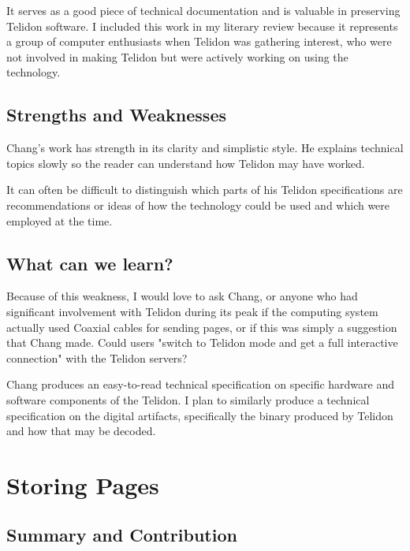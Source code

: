 \documentclass[sigconf]{acmart}
\begin{document}
It serves as a good piece of technical documentation and is valuable in preserving Telidon software. I included this work in my literary review because it represents a group of computer enthusiasts when Telidon was gathering interest, who were not involved in making Telidon but were actively working on using the technology.

\subsection{Strengths and Weaknesses}

Chang's work has strength in its clarity and simplistic style. He explains technical topics slowly so the reader can understand how Telidon may have worked.

It can often be difficult to distinguish which parts of his Telidon specifications are recommendations or ideas of how the technology could be used and which were employed at the time. 

\subsection{What can we learn?}

Because of this weakness, I would love to ask Chang, or anyone who had significant involvement with Telidon during its peak if the computing system actually used Coaxial cables for sending pages, or if this was simply a suggestion that Chang made. Could users "switch to Telidon mode and get a full interactive connection" with the Telidon servers?

Chang produces an easy-to-read technical specification on specific hardware and software components of the Telidon. I plan to similarly produce a technical specification on the digital artifacts, specifically the binary produced by Telidon and how that may be decoded. 

\section{Storing Pages}


\subsection{Summary and Contribution}
\end{document}
